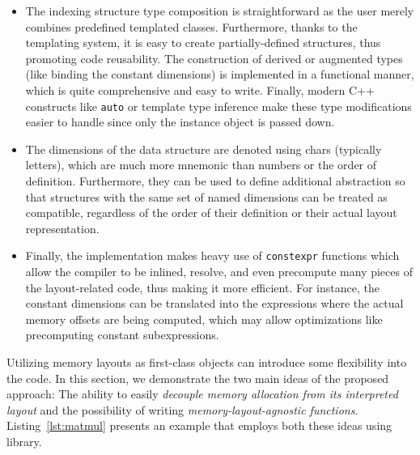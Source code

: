 \begin{itemize}
    \item The indexing structure type composition is straightforward as the user merely combines predefined \Noarr{} templated classes. Furthermore, thanks to the templating system, it is easy to create partially-defined structures, thus promoting code reusability. The construction of derived or augmented types (like binding the constant dimensions) is implemented in a functional manner, which is quite comprehensive and easy to write. Finally, modern C++ constructs like \texttt{auto} or template type inference make these type modifications easier to handle since only the instance object is passed down.
    \item The dimensions of the data structure are denoted using chars (typically letters), which are much more mnemonic than numbers or the order of definition. Furthermore, they can be used to define additional abstraction so that structures with the same set of named dimensions can be treated as compatible, regardless of the order of their definition or their actual layout representation.
    \item Finally, the implementation makes heavy use of \texttt{constexpr} functions which allow the compiler to be inlined, resolve, and even precompute many pieces of the layout-related code, thus making it more efficient. For instance, the constant dimensions can be translated into the expressions where the actual memory offsets are being computed, which may allow optimizations like precomputing constant subexpressions.
\end{itemize}

Utilizing memory layouts as first-class objects can introduce some flexibility into the code. In this section, we demonstrate the two main ideas of the proposed approach: The ability to easily \emph{decouple memory allocation from its interpreted layout} and the possibility of writing \emph{memory-layout-agnostic functions}. Listing~\ref{lst:matmul} presents an example that employs both these ideas using \Noarr{} library.


